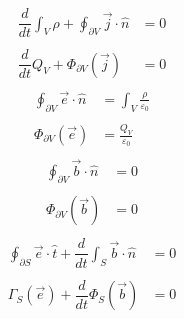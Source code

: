 \documentclass[letterpaper,10pt,english]{jupyterBook}
\begin{document}
\sphinxAtStartPar
{}
\begin{equation*}
\begin{split}\begin{aligned}
    \dfrac{d}{dt} \int_{V} \rho + \oint_{\partial V} \vec{j} \cdot \hat{n} & = 0 \\ \\
    \dfrac{d}{dt} Q_V + \Phi_{\partial V}\left( \vec{j} \right) & = 0
\end{aligned}\end{split}
\end{equation*}
\sphinxAtStartPar
{}
\begin{equation*}
\begin{split}\begin{aligned}
    \oint_{\partial V} \vec{e} \cdot \hat{n} & = \int_{V} \frac{\rho}{\varepsilon_0} \\ \\
    \Phi_{\partial V}(\vec{e}) & = \frac{Q_V}{\varepsilon_0}
\end{aligned}\end{split}
\end{equation*}
\sphinxAtStartPar
{}
\begin{equation*}
\begin{split}\begin{aligned}
    \oint_{\partial V} \vec{b} \cdot \hat{n} & = 0 \\  \\
    \Phi_{\partial V}\left( \vec{b} \right) & = 0
\end{aligned}\end{split}
\end{equation*}
\sphinxAtStartPar
{}
\begin{equation*}
\begin{split}\begin{aligned}
    \oint_{\partial S} \vec{e} \cdot \hat{t} + \dfrac{d}{dt} \int_{S} \vec{b} \cdot \hat{n} & = 0 \\  \\
    \Gamma_{S} \left( \vec{e} \right) + \dfrac{d}{dt} \Phi_{S} \left( \vec{b} \right) & = 0
\end{aligned}\end{split}
\end{equation*}
\sphinxAtStartPar
\end{document}

